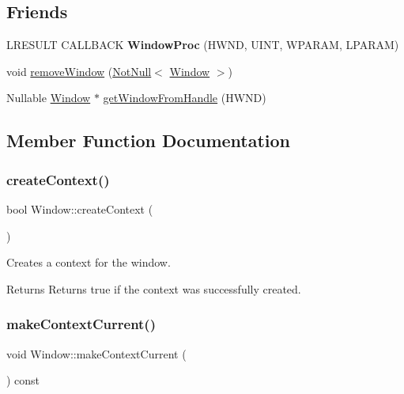 \subsection*{Friends}
\begin{DoxyCompactItemize}
\item 
\mbox{\label{class_window_a322e1f1b8964238cce26e206645caf33}} 
L\+R\+E\+S\+U\+LT C\+A\+L\+L\+B\+A\+CK {\bfseries Window\+Proc} (H\+W\+ND, U\+I\+NT, W\+P\+A\+R\+AM, L\+P\+A\+R\+AM)
\item 
void \mbox{\hyperlink{class_window_ac4632fb84e38a760660b81ad8663d4a6}{remove\+Window}} (\mbox{\hyperlink{class_not_null}{Not\+Null}}$<$ \mbox{\hyperlink{class_window}{Window}} $>$)
\item 
Nullable \mbox{\hyperlink{class_window}{Window}} $\ast$ \mbox{\hyperlink{class_window_a56aa20fd34aba260a2f15d54541ea396}{get\+Window\+From\+Handle}} (H\+W\+ND)
\end{DoxyCompactItemize}


\subsection{Member Function Documentation}
\mbox{\label{class_window_ae8f88271d37b496acde43280b8e7d99c}} 
\subsubsection{\texorpdfstring{create\+Context()}{createContext()}}
{\footnotesize\ttfamily bool Window\+::create\+Context (\begin{DoxyParamCaption}{ }\end{DoxyParamCaption})\hspace{0.3cm}{\ttfamily [noexcept]}}

Creates a context for the window.

\begin{DoxyReturn}{Returns}
Returns true if the context was successfully created. 
\end{DoxyReturn}
\mbox{\label{class_window_ab217dfd20f30652a98647fec702a55a5}} 
\subsubsection{\texorpdfstring{make\+Context\+Current()}{makeContextCurrent()}}
{\footnotesize\ttfamily void Window\+::make\+Context\+Current (\begin{DoxyParamCaption}{ }\end{DoxyParamCaption}) const\hspace{0.3cm}{\ttfamily [noexcept]}}

